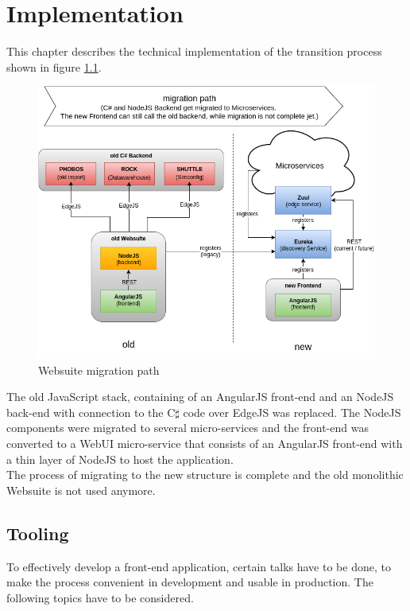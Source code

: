 
\chapter{Implementation}
This chapter describes the technical implementation of the transition process shown in figure \ref{fig:websuite-migration}.

\begin{figure}[H]
	\centering\includegraphics[width=1\textwidth]{res/Websuite_migration}
	\caption{Websuite migration path}
	\label{fig:websuite-migration}
\end{figure}

The old JavaScript stack, containing of an AngularJS front-end and an NodeJS back-end with connection to the C$\sharp$ code over EdgeJS was replaced. The NodeJS components were migrated to several micro-services and the front-end was converted to a WebUI micro-service that consists of an AngularJS front-end with a thin layer of NodeJS to host the application.\\
The process of migrating to the new structure is complete and the old monolithic Websuite is not used anymore.



\section{Tooling}
To effectively develop a front-end application, certain talks have to be done, to make the process convenient in development and usable in production. The following topics have to be considered.


